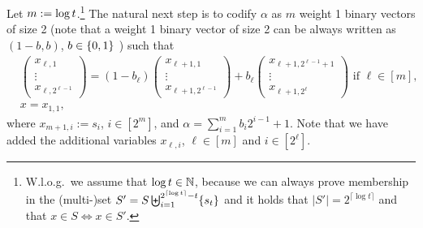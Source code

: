 Let $m:=\log t$.\footnote{ W.l.o.g.~we assume that \(\log t \in\mathbb{N}\), because we can always prove membership in the (multi-)set \(S'=S\biguplus_{i=1}^{2^{\lceil \log t  \rceil}-t}\{s_{t} \}\) and it holds that $|S'|=2^{\lceil \log t \rceil}$ and that $x\in S \Longleftrightarrow x\in S'$.} The natural next step is to codify \(\alpha\) as \(m\) weight 1 binary vectors of size 2 (note that a weight 1 binary vector of size 2 can be always written as \((1-b,b)\), \(b\in\{0,1\}\) ) such that
\begin{align}
&\begin{pmatrix}
x_{\ell,1}\\\vdots\\x_{\ell,{2^{\ell-1}}}
\end{pmatrix}
=
(1-b_\ell)
\begin{pmatrix}
x_{\ell+1,1}\\\vdots\\x_{\ell+1,{2^{\ell-1}}}
\end{pmatrix}
+
b_\ell
\begin{pmatrix}
x_{\ell+1, 2^{\ell-1}+1}\\\vdots\\x_{\ell+1,2^{\ell}}
\end{pmatrix}
\text{ if } \ell \in[m],\label{eq-log-2}\\
&
x= x_{1,1}\label{eq-log-3},
\end{align}
where \(x_{m+1,i}:=s_i\), \(i\in[2^m]\), and \(\alpha=\sum_{i=1}^{m}b_i2^{i-1}+1\). Note that we have added the additional variables \(x_{\ell,i}\), \(\ell\in[m]\) and \(i\in[2^\ell]\).


